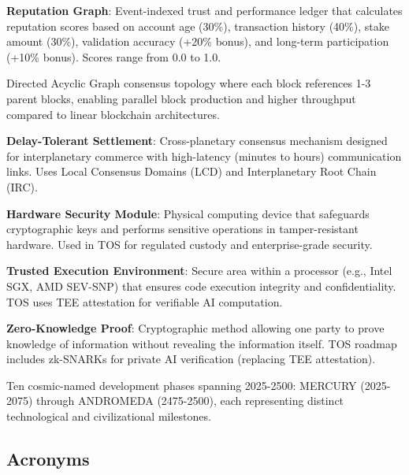 \documentclass[11pt]{article}
\begin{document}
\begin{description}[leftmargin=3cm, style=nextline]
  \item[RepGraph] \textbf{Reputation Graph}: Event-indexed trust and performance ledger that calculates reputation scores based on account age (30\%), transaction history (40\%), stake amount (30\%), validation accuracy (+20\% bonus), and long-term participation (+10\% bonus). Scores range from 0.0 to 1.0.

  \item[BlockDAG] Directed Acyclic Graph consensus topology where each block references 1-3 parent blocks, enabling parallel block production and higher throughput compared to linear blockchain architectures.

  \item[DT-Settlement] \textbf{Delay-Tolerant Settlement}: Cross-planetary consensus mechanism designed for interplanetary commerce with high-latency (minutes to hours) communication links. Uses Local Consensus Domains (LCD) and Interplanetary Root Chain (IRC).

  \item[HSM] \textbf{Hardware Security Module}: Physical computing device that safeguards cryptographic keys and performs sensitive operations in tamper-resistant hardware. Used in TOS for regulated custody and enterprise-grade security.

  \item[TEE] \textbf{Trusted Execution Environment}: Secure area within a processor (e.g., Intel SGX, AMD SEV-SNP) that ensures code execution integrity and confidentiality. TOS uses TEE attestation for verifiable AI computation.

  \item[ZK Proof] \textbf{Zero-Knowledge Proof}: Cryptographic method allowing one party to prove knowledge of information without revealing the information itself. TOS roadmap includes zk-SNARKs for private AI verification (replacing TEE attestation).

  \item[Celestial Eras] Ten cosmic-named development phases spanning 2025-2500: MERCURY (2025-2075) through ANDROMEDA (2475-2500), each representing distinct technological and civilizational milestones.
\end{description}

\subsection*{Acronyms}
\end{document}
